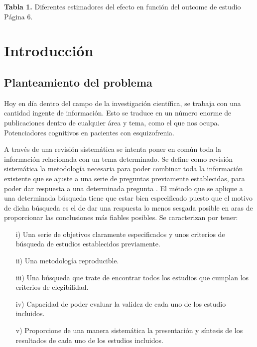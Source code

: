 \documentclass[a4paper,openright,12pt]{report}
\begin{document}
\textbf{Tabla 1.} Diferentes estimadores del efecto en función del outcome de estudio Página 6.


\pagestyle{myheadings}
\chapter{Introducción}\label{cap.introduccion}
\section{Planteamiento del problema}
Hoy en día dentro del campo de la investigación científica, se trabaja con una cantidad ingente de información. Esto se traduce en un número enorme de publicaciones dentro de cualquier área y tema, como el que nos ocupa. Potenciadores cognitivos en pacientes con esquizofrenia.

A través de una revisión sistemática se intenta poner en común toda la información relacionada con un tema determinado. Se define como revisión sistemática la metodología necesaria para poder combinar toda la información existente que se ajuste a una serie de preguntas previamente establecidas, para poder dar respuesta a una determinada pregunta \cite{Cochrane_man}. El método que se aplique a una determinada búsqueda tiene que estar bien especificado puesto que el motivo de dicha búsqueda es el de dar una respuesta lo menos sesgada posible en aras de proporcionar las conclusiones más fiables posibles. Se caracterizan por tener:
\begin{itemize}
\item[i)] Una serie de objetivos claramente especificados y unos criterios de búsqueda de estudios establecidos previamente.
\item[ii)] Una metodología reproducible.
\item[iii)]Una búsqueda que trate de encontrar todos los estudios que cumplan los criterios de elegibilidad.
\item[iv)] Capacidad de poder evaluar la validez de cada uno de los estudio incluidos.
\item[v)] Proporcione de una manera sistemática la presentación y síntesis de los resultados de cada uno de los estudios incluidos.
\end{itemize}
\end{document}
